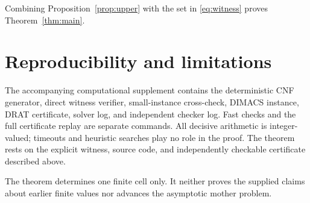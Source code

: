 \documentclass[11pt]{amsart}
\begin{document}
Combining Proposition~\ref{prop:upper} with the set in
\eqref{eq:witness} proves Theorem~\ref{thm:main}.

\section{Reproducibility and limitations}
The accompanying computational supplement contains the deterministic CNF generator, direct
witness verifier, small-instance cross-check, DIMACS instance, DRAT
certificate, solver log, and independent checker log. Fast checks and the full
certificate replay are separate commands. All decisive arithmetic is
integer-valued; timeouts and heuristic searches play no role in the proof.
The theorem rests on the explicit witness, source code, and independently
checkable certificate described above.

The theorem determines one finite cell only. It neither proves the supplied
claims about earlier finite values nor advances the asymptotic mother problem.



\end{document}
